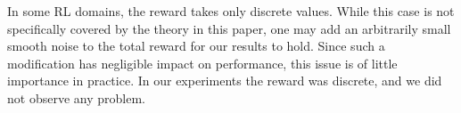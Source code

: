 \documentclass[letterpaper]{article}
\newcommand{\prob}{\mathrm{Pr}}
\newcommand{\bx}{\mathbf{x}}
\newcommand{\bX}{\mathbf{X}}
\newcommand{\Dth}{\frac{\partial}{\partial \theta_j}}
\newcommand{\Dt}[1]{\frac{\partial {#1}}{\partial \theta_j}}
\newcommand{\dcvar}{\Delta_{j;N}} %
\newcommand{\dcvarfull}{\Delta_{1;N},\dots,\Delta_{K;N}} %
\begin{document}
In some RL domains, the reward takes only discrete values. While this case is not specifically covered by the theory in this paper, one may add an arbitrarily small smooth noise to the total reward for our results to hold. Since such a modification has negligible impact on performance, this issue is of little importance in practice. In our experiments the reward was discrete, and we did not observe any problem.


\end{document}
